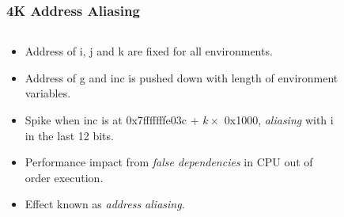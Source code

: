\documentclass{beamer}
\begin{document}
\begin{frame}

\end{frame}


\begin{frame}
\frametitle{4K Address Aliasing}

\begin{columns}[T] %
\begin{column}{.48\textwidth}

\begin{itemize}
  \item Address of i, j and k are fixed for all environments.
  \item Address of g and inc is pushed down with length of environment variables.
  \item Spike when inc is at 0x7fffffffe03c + $ k \times $ 0x1000, \emph{aliasing} with i in the last 12 bits.
  \item Performance impact from \emph{false dependencies} in CPU out of order execution.
  \item Effect known as \emph{address aliasing}.
\end{itemize}

\end{column}
\hfill
\begin{column}{.48\textwidth}

\begin{figure}
\end{figure}
\end{column}
\end{columns}
\end{frame}
\end{document}
